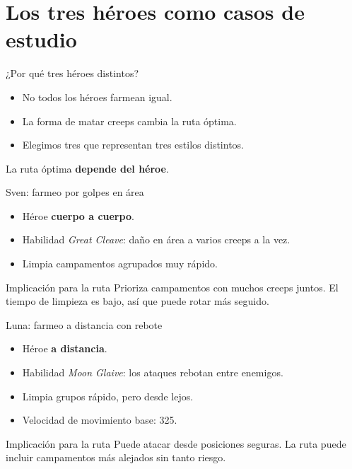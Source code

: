 \section{Los tres héroes como casos de estudio}

\begin{frame}{¿Por qué tres héroes distintos?}
  \begin{itemize}
    \item No todos los héroes farmean igual.
    \item La forma de matar creeps cambia la ruta óptima.
    \item Elegimos tres que representan tres estilos distintos.
  \end{itemize}
  \vspace{0.8em}
  \begin{center}
    \Large La ruta óptima \textbf{depende del héroe}.
  \end{center}
\end{frame}

\begin{frame}{Sven: farmeo por golpes en área}
  \begin{itemize}
    \item Héroe \textbf{cuerpo a cuerpo}.
    \item Habilidad \textit{Great Cleave}: daño en área a varios creeps a la vez.
    \item Limpia campamentos agrupados muy rápido.
  \end{itemize}
  \vspace{0.5em}
  \begin{block}{Implicación para la ruta}
    Prioriza campamentos con muchos creeps juntos. El tiempo de limpieza es bajo, así que puede rotar más seguido.
  \end{block}
\end{frame}

\begin{frame}{Luna: farmeo a distancia con rebote}
  \begin{itemize}
    \item Héroe \textbf{a distancia}.
    \item Habilidad \textit{Moon Glaive}: los ataques rebotan entre enemigos.
    \item Limpia grupos rápido, pero desde lejos.
    \item Velocidad de movimiento base: 325.
  \end{itemize}
  \vspace{0.5em}
  \begin{block}{Implicación para la ruta}
    Puede atacar desde posiciones seguras. La ruta puede incluir campamentos más alejados sin tanto riesgo.
  \end{block}
\end{frame}


